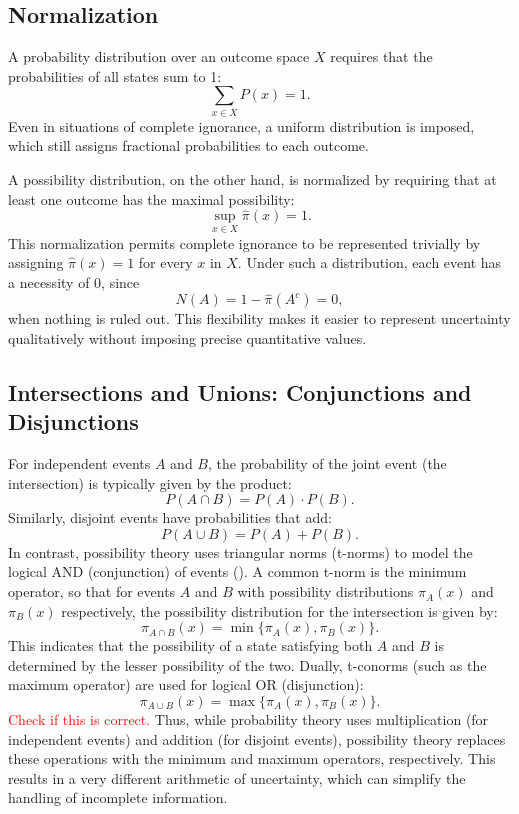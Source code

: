\documentclass[12pt,a4paper]{report}
\newcommand\myworries[1]{\textcolor{red}{#1}}
\begin{document}
\subsection{Normalization}
A probability distribution over an outcome space \(X\) requires that the probabilities of all states sum to 1:
\[
\sum_{x \in X} P(x) = 1.
\]
Even in situations of complete ignorance, a uniform distribution is imposed, which still assigns fractional probabilities to each outcome.

A possibility distribution, on the other hand, is normalized by requiring that at least one outcome has the maximal possibility:
\[
  \sup_{x \in X} \hat{\pi}(x) = 1.
\]
This normalization permits complete ignorance to be represented trivially by assigning \( \hat{\pi}(x)=1 \) for every \(x\) in \(X\). Under such a distribution, each event has a necessity of 0, since
\[
N(A) = 1 - \hat{\pi}(A^c) = 0,
\]
when nothing is ruled out. This flexibility makes it easier to represent uncertainty qualitatively without imposing precise quantitative values.

\subsection{Intersections and Unions: Conjunctions and Disjunctions}
For independent events \(A\) and \(B\), the probability of the joint event (the intersection) is typically given by the product:
\[
P(A \cap B) = P(A) \cdot P(B).
\]
Similarly, disjoint events have probabilities that add:
\[
P(A \cup B) = P(A) + P(B).
\]
In contrast, possibility theory uses triangular norms (t-norms) to model the logical AND (conjunction) of events (\cite{DUBOIS01021982}). A common t-norm is the minimum operator, so that for events \(A\) and \(B\) with possibility distributions \( \pi_A(x) \) and \( \pi_B(x) \) respectively, the possibility distribution for the intersection is given by:
\[
\pi_{A \cap B}(x) = \min\{ \pi_A(x), \pi_B(x) \}.
\]
This indicates that the possibility of a state satisfying both \(A\) and \(B\) is determined by the lesser possibility of the two. Dually, t-conorms (such as the maximum operator) are used for logical OR (disjunction):
\[
\pi_{A \cup B}(x) = \max\{ \pi_A(x), \pi_B(x) \}.
\]
\myworries{Check if this is correct.} Thus, while probability theory uses multiplication (for independent events) and addition (for disjoint events), possibility theory replaces these operations with the minimum and maximum operators, respectively. This results in a very different arithmetic of uncertainty, which can simplify the handling of incomplete information.
\end{document}
